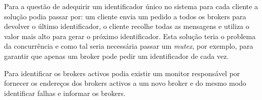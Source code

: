Para a questão de adequirir um identificador único no sistema para cada cliente a solução podia passar por:
um cliente envia um pedido a todos os brokers para devolver o último identificador, o cliente recolhe todas as mensagens e utiliza o valor mais alto para gerar o próximo identificador. Esta solução teria o problema da concurrência e como tal seria necessária passar um \textit{mutex}, por exemplo, para garantir que apenas um broker pode pedir um identificador de cada vez.

Para identificar os brokers activos podia existir um monitor responsável por fornecer os endereços dos brokers activos a um novo broker e do mesmo modo identificar falhas e informar os brokers.
